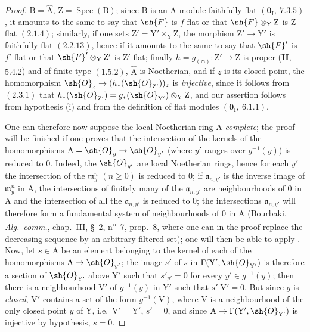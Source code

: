 \begin{proof}
$\mathrm{B}=\hat{\mathrm{A}}$, $\mathrm{Z}=\operatorname{Spec}(\mathrm{B})$; since $\mathrm{B}$ is an $\mathrm{A}$-module faithfully flat $(\mathbf{0}_\mathrm{I},~7.3.5)$, it amounts
to the same to say that $\sh{F}$ is $f$-flat or that $\sh{F}\otimes_\mathrm{Y}\mathrm{Z}$ is $\mathrm{Z}$-flat $(2.1.4)$; similarly, if one
sets $\mathrm{Z}'=\mathrm{Y}'\times_\mathrm{Y}\mathrm{Z}$, the morphism $\mathrm{Z}'\to\mathrm{Y}'$ is faithfully flat $(2.2.13)$, hence if
it amounts to the same to say that $\sh{F}'$ is $f'$-flat or that $\sh{F}'\otimes_\mathrm{Y}\mathrm{Z}'$ is $\mathrm{Z}'$-flat; finally $h=g_{(\mathfrak{m})}:\mathrm{Z}'\to\mathrm{Z}$
is proper (\textbf{II},~$5.4.2$) and of finite type $(1.5.2)$, $\hat{\mathrm{A}}$ is Noetherian, and if $z$ is its
closed point, the homomorphism $\sh{O}_z\to(h_*(\sh{O}_{\mathrm{Z}'}))_z$ is \emph{injective}, since it follows from $(2.3.1)$ that
$h_*(\sh{O}_{\mathrm{Z}'})=g_*(\sh{O}_{\mathrm{Y}'})\otimes_\mathrm{Y}\mathrm{Z}$, and our assertion follows from hypothesis (i) and from the definition of
flat modules $(\mathbf{0}_\mathrm{I},~6.1.1)$.

One can therefore now suppose the local Noetherian ring $\mathrm{A}$ \emph{complete}; the proof
will be finished if one proves that the intersection of the kernels of the homomorphisms
$\mathrm{A}=\sh{O}_y\to\sh{O}_{y'}$ (where $y'$ ranges over $g^{-1}(y)$) is reduced to $0$. Indeed, the $\sh{O}_{y'}$ are local
Noetherian rings, hence for each $y'$ the intersection of the $\mathfrak{m}_y^n$ $(n\geq 0)$ is reduced to $0$;
if $\mathfrak{a}_{n,y'}$ is the inverse image of $\mathfrak{m}_y^n$ in $\mathrm{A}$, the intersections of finitely many of the $\mathfrak{a}_{n,y'}$ are
neighbourhoods of $0$ in $\mathrm{A}$ and the intersection of all the $\mathfrak{a}_{n,y'}$ is reduced to $0$; the intersections
$\mathfrak{a}_{n,y'}$ will therefore form a fundamental system of neighbourhoods of $0$ in $\mathrm{A}$
(Bourbaki, \emph{Alg.\ comm.}, chap.~III, \S~2, n\textsuperscript{o}~7, prop.~8, where one can in the proof
replace the decreasing sequence by an arbitrary filtered set); one will then be able to
apply . Now, let $s\in\mathrm{A}$ be an element belonging to the kernel of each of
the homomorphisms $\mathrm{A}\to\sh{O}_{y'}$; the image $s'$ of $s$ in $\Gamma(\mathrm{Y}',\sh{O}_{\mathrm{Y}'})$ is therefore a section
of $\sh{O}_{\mathrm{Y}'}$ above $\mathrm{Y}'$ such that $s'_{y'}=0$ for every $y'\in g^{-1}(y)$; then there is a neighbourhood $\mathrm{V}'$
of $g^{-1}(y)$ in $\mathrm{Y}'$ such that $s'|\mathrm{V}'=0$. But since $g$ is \emph{closed}, $\mathrm{V}'$ contains a set
of the form $g^{-1}(\mathrm{V})$, where $\mathrm{V}$ is a neighbourhood of the only closed point $y$ of $\mathrm{Y}$, i.e.\ $\mathrm{V}'=\mathrm{Y}'$,
$s'=0$, and since $\mathrm{A}\to\Gamma(\mathrm{Y}',\sh{O}_{\mathrm{Y}'})$ is injective by hypothesis, $s=0$.
\end{proof}

